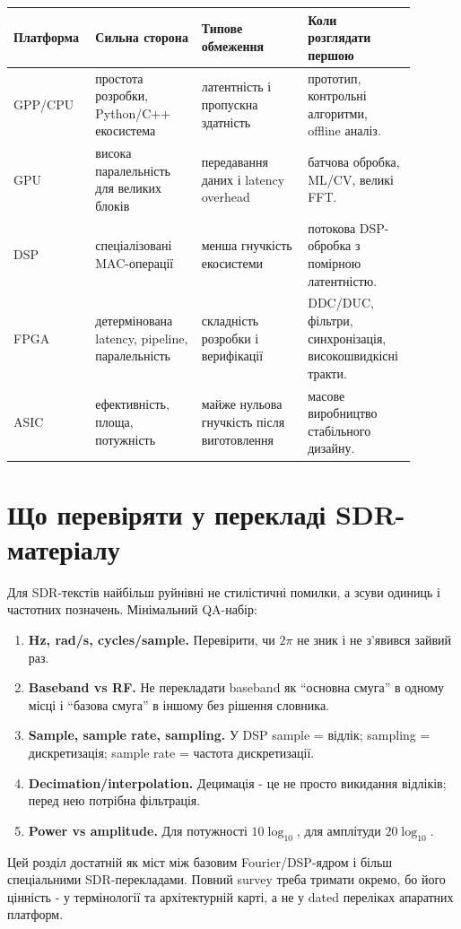 \begin{longtable}{L{0.17\linewidth}L{0.25\linewidth}L{0.25\linewidth}L{0.22\linewidth}}
\toprule
\textbf{Платформа} & \textbf{Сильна сторона} & \textbf{Типове обмеження} & \textbf{Коли розглядати першою}\\
\midrule
GPP/CPU & простота розробки, Python/C++ екосистема & латентність і пропускна здатність & прототип, контрольні алгоритми, offline аналіз.\\
GPU & висока паралельність для великих блоків & передавання даних і latency overhead & батчова обробка, ML/CV, великі FFT.\\
DSP & спеціалізовані MAC-операції & менша гнучкість екосистеми & потокова DSP-обробка з помірною латентністю.\\
FPGA & детермінована latency, pipeline, паралельність & складність розробки і верифікації & DDC/DUC, фільтри, синхронізація, високошвидкісні тракти.\\
ASIC & ефективність, площа, потужність & майже нульова гнучкість після виготовлення & масове виробництво стабільного дизайну.\\
\bottomrule
\end{longtable}

\section{Що перевіряти у перекладі SDR-матеріалу}

Для SDR-текстів найбільш руйнівні не стилістичні помилки, а зсуви одиниць і частотних позначень. Мінімальний QA-набір:

\begin{enumerate}[label=\arabic*.]
\item \textbf{Hz, rad/s, cycles/sample.} Перевірити, чи $2\pi$ не зник і не з'явився зайвий раз.
\item \textbf{Baseband vs RF.} Не перекладати baseband як ``основна смуга'' в одному місці і ``базова смуга'' в іншому без рішення словника.
\item \textbf{Sample, sample rate, sampling.} У DSP sample = відлік; sampling = дискретизація; sample rate = частота дискретизації.
\item \textbf{Decimation/interpolation.} Децимація - це не просто викидання відліків; перед нею потрібна фільтрація.
\item \textbf{Power vs amplitude.} Для потужності $10\log_{10}$, для амплітуди $20\log_{10}$.
\end{enumerate}

Цей розділ достатній як міст між базовим Fourier/DSP-ядром і більш спеціальними SDR-перекладами. Повний survey треба тримати окремо, бо його цінність - у термінології та архітектурній карті, а не у dated переліках апаратних платформ.
